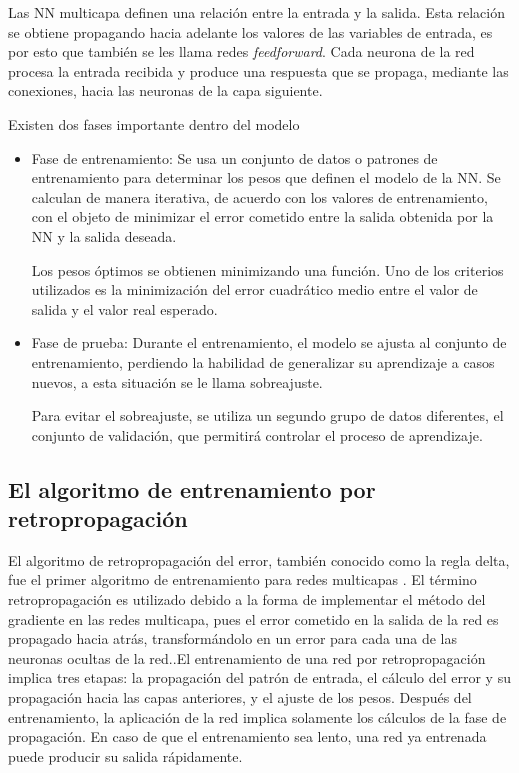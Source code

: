 Las NN multicapa definen una relación entre la entrada y la salida. Esta relación se obtiene propagando hacia adelante los valores de las variables de entrada, es por esto que también se les llama redes {\em feedforward}. Cada neurona de la red procesa la entrada recibida y produce una respuesta que se propaga, mediante las conexiones, hacia las neuronas de la capa siguiente.

Existen dos fases importante dentro del modelo
\begin{itemize}
	\item Fase de entrenamiento: Se usa un conjunto de datos o patrones de entrenamiento para determinar los pesos que definen el modelo de la NN. Se calculan de manera iterativa, de acuerdo con los valores de entrenamiento, con el objeto de minimizar el error cometido entre la salida obtenida por la NN y la salida deseada.

	Los pesos óptimos se obtienen minimizando una función. Uno de los criterios utilizados es la minimización del error cuadrático medio entre el valor de salida y el valor real esperado.

	\item Fase de prueba: Durante el entrenamiento, el modelo se ajusta al conjunto de entrenamiento, perdiendo la habilidad de generalizar su aprendizaje a casos nuevos, a esta situación se le llama sobreajuste.

	Para evitar el sobreajuste, se utiliza un segundo grupo de datos diferentes, el conjunto de validación, que permitirá controlar el proceso de aprendizaje.
\end{itemize}


\subsection{El algoritmo de entrenamiento por retropropagación}
El algoritmo de retropropagación del error, también conocido como la regla delta, fue el primer algoritmo de entrenamiento para redes multicapas  \cite{Werbos1974, Rumelhart1986}. El término retropropagación es utilizado debido a la forma de implementar el método del gradiente en las redes multicapa, pues el error cometido en la salida de la red es propagado hacia atrás, transformándolo en un error para cada una de las neuronas ocultas de la red..El entrenamiento de una red por retropropagación implica tres etapas: la propagación del patrón de entrada, el cálculo del error y su propagación hacia las capas anteriores, y el ajuste de los pesos. Después del entrenamiento, la aplicación de la red implica solamente los cálculos de la fase de propagación. En caso de que el entrenamiento sea lento, una red ya entrenada puede producir su salida rápidamente.


